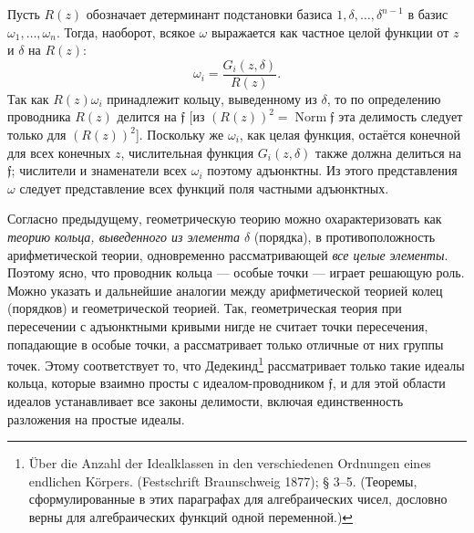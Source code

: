 \documentclass[11pt]{article}
\providecommand{\frf}{\mathfrak f}
\begin{document}
Пусть \(R(z)\) обозначает детерминант подстановки базиса \(1,\delta,\ldots,\delta^{n-1}\) в базис \(\omega_1,\ldots,\omega_n\). Тогда, наоборот, всякое \(\omega\) выражается как частное целой функции от \(z\) и \(\delta\) на \(R(z)\):
\[
\omega_i=\frac{G_i(z,\delta)}{R(z)}.
\]
Так как \(R(z)\omega_i\) принадлежит кольцу, выведенному из \(\delta\), то по определению проводника \(R(z)\) делится на \(\frf\) [из \((R(z))^2=\operatorname{Norm}\frf\) эта делимость следует только для \((R(z))^2\)]. Поскольку же \(\omega_i\), как целая функция, остаётся конечной для всех конечных \(z\), числительная функция \(G_i(z,\delta)\) также должна делиться на \(\frf\); числители и знаменатели всех \(\omega_i\) поэтому адъюнктны. Из этого представления \(\omega\) следует представление всех функций поля частными адъюнктных.

Согласно предыдущему, геометрическую теорию можно охарактеризовать как \emph{теорию кольца, выведенного из элемента \(\delta\)} (порядка), в противоположность арифметической теории, одновременно рассматривающей \emph{все целые элементы}. Поэтому ясно, что проводник кольца --- особые точки --- играет решающую роль. Можно указать и дальнейшие аналогии между арифметической теорией колец (порядков) и геометрической теорией. Так, геометрическая теория при пересечении с адъюнктными кривыми нигде не считает точки пересечения, попадающие в особые точки, а рассматривает только отличные от них группы точек. Этому соответствует то, что Дедекинд\footnote{Über die Anzahl der Idealklassen in den verschiedenen Ordnungen eines endlichen Körpers. (Festschrift Braunschweig 1877); § 3--5. (Теоремы, сформулированные в этих параграфах для алгебраических чисел, дословно верны для алгебраических функций одной переменной.)} рассматривает только такие идеалы кольца, которые взаимно просты с идеалом-проводником \(\frf\), и для этой области идеалов устанавливает все законы делимости, включая единственность разложения на простые идеалы.
\end{document}
